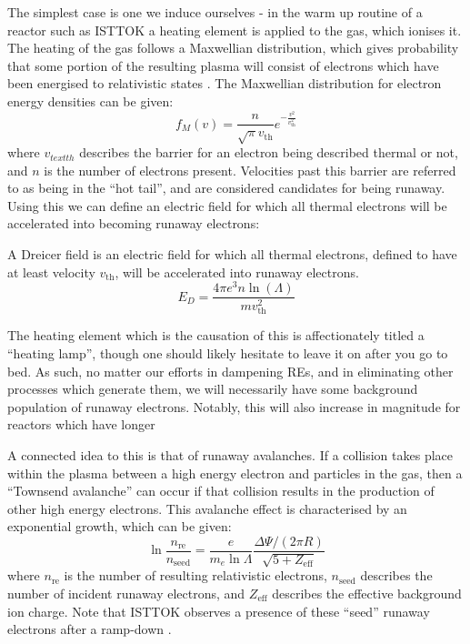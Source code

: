 The simplest case is one we induce ourselves - in the warm up routine of a reactor such as ISTTOK a heating element 
is applied to the gas, which ionises it. The heating of the gas follows a Maxwellian distribution, which 
gives probability that some portion of the resulting plasma will consist of electrons which have been 
energised to relativistic states \cite{runaway-electrons}. The Maxwellian distribution for electron energy densities 
can be given:
$$f_{M}(v) = \frac{n}{\sqrt{\pi} v_{\text{th}}} e^{-\frac{v^2}{v_{\text{th}}^2}}$$
where $v_{text{th}}$ describes the barrier for an electron being described thermal or not, and $n$ is the number 
of electrons present. Velocities past this barrier are referred to as being in the ``hot tail'', and are considered 
candidates for being runaway. Using this we can define an electric field for which all thermal electrons will be 
accelerated into becoming runaway electrons:
\begin{definition}
    A Dreicer field is an electric field for which all thermal electrons, defined to have at least velocity $v_{\text{th}}$,
    will be accelerated into runaway electrons.
    \begin{equation*}
        E_{D} = \frac{4\pi e^3 n \ln (\Lambda)}{m v_{\text{th}}^2}
    \end{equation*}
\end{definition}
The heating element which is the causation of this is affectionately titled a ``heating lamp'', 
though one should likely hesitate to leave it on after you go to bed. As such, no matter our efforts in dampening 
REs, and in eliminating other processes which generate them, we will necessarily have some background population 
of runaway electrons. Notably, this will also increase in magnitude for reactors which have longer 

A connected idea to this is that of runaway avalanches. If a collision takes place within the plasma between a high 
energy electron and particles in the gas, then a ``Townsend avalanche'' can occur if that collision results in the production of other 
high energy electrons. This avalanche effect is characterised by an exponential growth, which can be given:
\begin{equation*}
    \ln \frac{n_{\text{re}}}{n_{\text{seed}}} = \frac{e}{m_e \ln \Lambda} \frac{\Delta \Psi / (2\pi R)}{\sqrt{5 + Z_{\text{eff}}}}
\end{equation*}
where $n_{\text{re}}$ is the number of resulting relativistic electrons, $n_{\text{seed}}$ describes the 
number of incident runaway electrons, and $Z_{\text{eff}}$ describes the effective background ion charge. Note that ISTTOK observes a 
presence of these ``seed'' runaway electrons after a ramp-down \cite{malaquias-matthew}.

